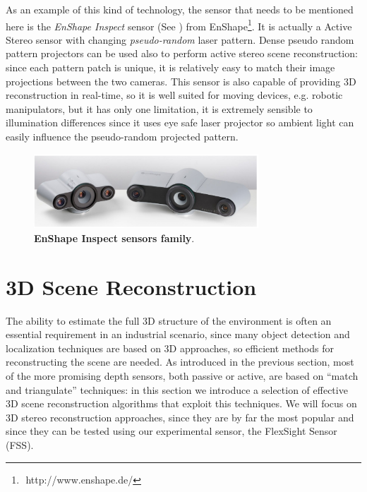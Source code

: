 As an example of this kind of technology, the sensor that needs to be mentioned here is the \emph{EnShape Inspect} sensor (See ) from EnShape\footnote{​ http://www.enshape.de/}. It is actually a Active Stereo sensor with changing \emph{pseudo-random} laser pattern. Dense pseudo random pattern projectors can be used also to perform active stereo scene reconstruction: since each pattern patch is unique, it is relatively easy to match their image projections between the two cameras. This sensor is also capable of providing 3D reconstruction in real-time, so it is well suited for moving devices, e.g. robotic manipulators, but it has only one limitation, it is extremely sensible to illumination differences since it uses eye safe laser projector so ambient light can easily influence the pseudo-random projected pattern.

\begin{figure}
    \centering
    \includegraphics[width=0.75\textwidth]{figures/1_perception_and_sensing_in_robotics/enshape}
    \caption{\textbf{EnShape Inspect sensors family}.} 
    \label{fig:enshape}
\end{figure}

\section{3D Scene Reconstruction}\label{sec:3dreconstruction}
The ability to estimate the full 3D structure of the environment is often an essential requirement in an industrial scenario, since many object detection and localization techniques are based on 3D approaches, so efficient methods for reconstructing the scene are needed. As introduced in the previous section, most of the more promising depth sensors, both passive or active, are based on ``match and triangulate'' techniques: in this section we introduce a selection of effective 3D scene reconstruction algorithms that exploit this techniques. We will focus on 3D stereo reconstruction approaches, since they are by far the most popular and since they can be tested using our experimental sensor, the FlexSight Sensor (FSS).

